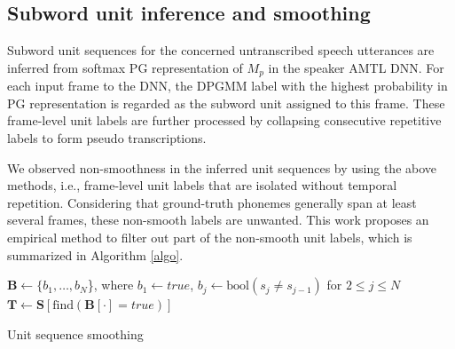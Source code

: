 \documentclass[a4paper]{article}
\begin{document}
\subsection{Subword unit inference and  smoothing}
Subword unit sequences for the concerned
untranscribed speech utterances are inferred from  softmax PG representation of $M_p$ in the speaker AMTL DNN.
For each input frame to the DNN, the DPGMM label with the highest probability in PG representation
is regarded as the subword unit assigned to this frame.  These  frame-level unit labels are further processed by collapsing consecutive repetitive labels to form pseudo transcriptions.

We observed non-smoothness in the inferred unit sequences by using the above methods, i.e.,  frame-level unit labels that are isolated without temporal repetition.
Considering that ground-truth phonemes generally span at least several frames, these non-smooth labels are unwanted. This work proposes an empirical method to filter out part of the non-smooth unit labels, which is summarized in Algorithm \ref{algo}.

\begin{algorithm}[h]
\SetAlgoLined
 $\bm{B} \leftarrow \{b_1, \ldots ,b_N$\}, where $b_1 \leftarrow \textit{true}$, $b_j \leftarrow \textrm{bool} (s_j\neq s_{j-1})$ for $2\leq j \leq N$\; 
 $\bm{T} \leftarrow \bm{S} [\textrm{find}(\bm{B[\cdot] = \textit{true}})]$\;
 \caption{Unit sequence smoothing}
 \label{algo}
\end{algorithm}
\end{document}
